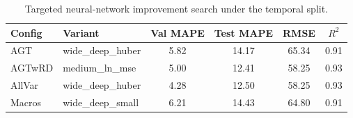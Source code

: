 \begin{table}[!htb]
\centering
\caption{Targeted neural-network improvement search under the temporal split.}
\label{tab:nn_improvement_search}
\begin{tabular}{l l c c c c}
\toprule
Config & Variant & Val MAPE & Test MAPE & RMSE & $R^2$ \\
\midrule
AGT & wide_deep_huber & 5.82 & 14.17 & 65.34 & 0.91 \\
AGTwRD & medium_ln_mse & 5.00 & 12.41 & 58.25 & 0.93 \\
AllVar & wide_deep_huber & 4.28 & 12.50 & 58.25 & 0.93 \\
Macros & wide_deep_small & 6.21 & 14.43 & 64.80 & 0.91 \\
\bottomrule
\end{tabular}
\end{table}
